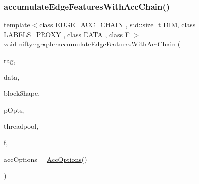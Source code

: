 \subsubsection{\texorpdfstring{accumulate\+Edge\+Features\+With\+Acc\+Chain()}{accumulateEdgeFeaturesWithAccChain()}}
{\footnotesize\ttfamily template$<$class E\+D\+G\+E\+\_\+\+A\+C\+C\+\_\+\+C\+H\+A\+IN , std\+::size\+\_\+t D\+IM, class L\+A\+B\+E\+L\+S\+\_\+\+P\+R\+O\+XY , class D\+A\+TA , class F $>$ \\
void nifty\+::graph\+::accumulate\+Edge\+Features\+With\+Acc\+Chain (\begin{DoxyParamCaption}\item[{const \hyperlink{classnifty_1_1graph_1_1GridRag}{Grid\+Rag}$<$ D\+IM, L\+A\+B\+E\+L\+S\+\_\+\+P\+R\+O\+XY $>$ \&}]{rag,  }\item[{const D\+A\+TA \&}]{data,  }\item[{const \hyperlink{namespacenifty_1_1array_a683f151f19c851754e0c6d55ed16a0c2}{array\+::\+Static\+Array}$<$ int64\+\_\+t, D\+IM $>$ \&}]{block\+Shape,  }\item[{const \hyperlink{classnifty_1_1parallel_1_1ParallelOptions}{parallel\+::\+Parallel\+Options} \&}]{p\+Opts,  }\item[{\hyperlink{classnifty_1_1parallel_1_1ThreadPool}{parallel\+::\+Thread\+Pool} \&}]{threadpool,  }\item[{F \&\&}]{f,  }\item[{const \hyperlink{structnifty_1_1graph_1_1AccOptions}{Acc\+Options} \&}]{acc\+Options = {\ttfamily \hyperlink{structnifty_1_1graph_1_1AccOptions}{Acc\+Options}()} }\end{DoxyParamCaption})}

\mbox{\label{namespacenifty_1_1graph_a44f9d32c6516b8a8fad328a7bffff8fe}} 
